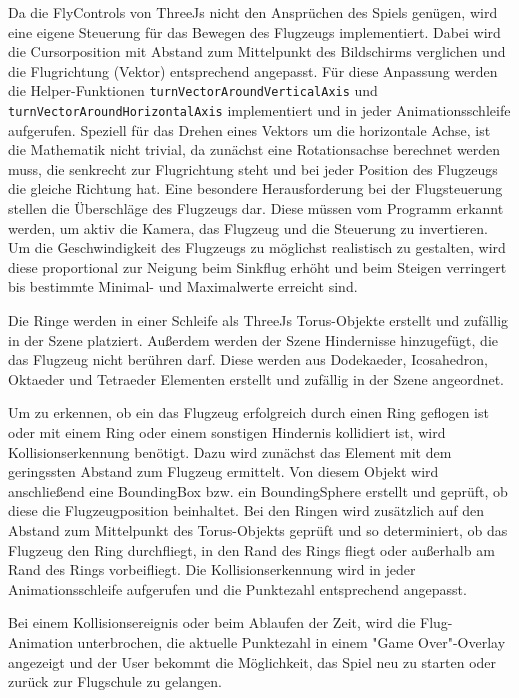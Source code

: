 Da die FlyControls von ThreeJs nicht den Ansprüchen des Spiels genügen, wird eine eigene Steuerung für das Bewegen des Flugzeugs implementiert.
Dabei wird die Cursorposition mit Abstand zum Mittelpunkt des Bildschirms verglichen und die Flugrichtung (Vektor) entsprechend angepasst.
Für diese Anpassung werden die Helper-Funktionen \texttt{turnVectorAroundVerticalAxis} und \texttt{turnVectorAroundHorizontalAxis} implementiert und in jeder Animationsschleife aufgerufen.
Speziell für das Drehen eines Vektors um die horizontale Achse, ist die Mathematik nicht trivial, da zunächst eine Rotationsachse berechnet werden muss, die senkrecht zur Flugrichtung steht und bei jeder Position des Flugzeugs die gleiche Richtung hat.
Eine besondere Herausforderung bei der Flugsteuerung stellen die Überschläge des Flugzeugs dar.
Diese müssen vom Programm erkannt werden, um aktiv die Kamera, das Flugzeug und die Steuerung zu invertieren.
Um die Geschwindigkeit des Flugzeugs zu möglichst realistisch zu gestalten, wird diese proportional zur Neigung beim Sinkflug erhöht und beim Steigen verringert bis bestimmte Minimal- und Maximalwerte erreicht sind.

Die Ringe werden in einer Schleife als ThreeJs Torus-Objekte erstellt und zufällig in der Szene platziert.
Außerdem werden der Szene Hindernisse hinzugefügt, die das Flugzeug nicht berühren darf.
Diese werden aus Dodekaeder, Icosahedron, Oktaeder und Tetraeder Elementen erstellt und zufällig in der Szene angeordnet.

Um zu erkennen, ob ein das Flugzeug erfolgreich durch einen Ring geflogen ist oder mit einem Ring oder einem sonstigen Hindernis kollidiert ist, wird Kollisionserkennung benötigt.
Dazu wird zunächst das Element mit dem geringssten Abstand zum Flugzeug ermittelt.
Von diesem Objekt wird anschließend eine BoundingBox bzw. ein BoundingSphere erstellt und geprüft, ob diese die Flugzeugposition beinhaltet.
Bei den Ringen wird zusätzlich auf den Abstand zum Mittelpunkt des Torus-Objekts geprüft und so determiniert, ob das Flugzeug den Ring durchfliegt, in den Rand des Rings fliegt oder außerhalb am Rand des Rings vorbeifliegt.
Die Kollisionserkennung wird in jeder Animationsschleife aufgerufen und die Punktezahl entsprechend angepasst.

Bei einem Kollisionsereignis oder beim Ablaufen der Zeit, wird die Flug-Animation unterbrochen, die aktuelle Punktezahl in einem "Game Over"-Overlay angezeigt und der User bekommt die Möglichkeit, das Spiel neu zu starten oder zurück zur Flugschule zu gelangen.